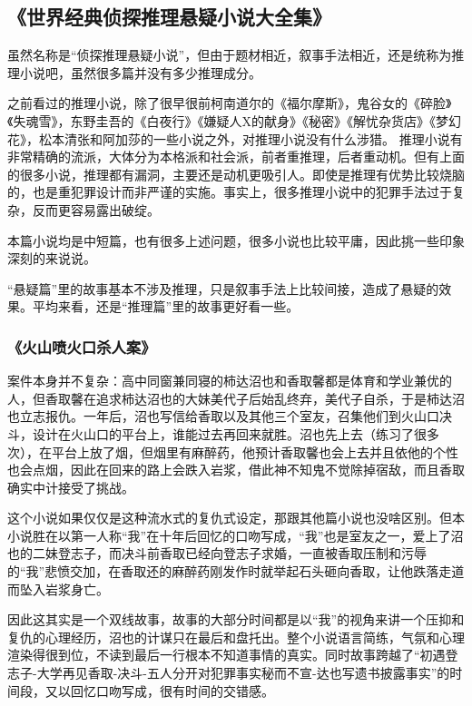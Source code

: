 \subsection{《世界经典侦探推理悬疑小说大全集》}

虽然名称是“侦探推理悬疑小说”，但由于题材相近，叙事手法相近，还是统称为推理小说吧，虽然很多篇并没有多少推理成分。

之前看过的推理小说，除了很早很前柯南道尔的《福尔摩斯》，鬼谷女的《碎脸》《失魂雪》，东野圭吾的《白夜行》《嫌疑人X的献身》《秘密》《解忧杂货店》《梦幻花》，松本清张和阿加莎的一些小说之外，对推理小说没有什么涉猎。
推理小说有非常精确的流派，大体分为本格派和社会派，前者重推理，后者重动机。但有上面的很多小说，推理都有漏洞，主要还是动机更吸引人。即使是推理有优势比较烧脑的，也是重犯罪设计而非严谨的实施。事实上，很多推理小说中的犯罪手法过于复杂，反而更容易露出破绽。

本篇小说均是中短篇，也有很多上述问题，很多小说也比较平庸，因此挑一些印象深刻的来说说。

“悬疑篇”里的故事基本不涉及推理，只是叙事手法上比较间接，造成了悬疑的效果。平均来看，还是“推理篇”里的故事更好看一些。

\subsubsection{《火山喷火口杀人案》}

案件本身并不复杂：高中同窗兼同寝的柿达沼也和香取馨都是体育和学业兼优的人，但香取馨在追求柿达沼也的大妹美代子后始乱终弃，美代子自杀，于是柿达沼也立志报仇。一年后，沼也写信给香取以及其他三个室友，召集他们到火山口决斗，设计在火山口的平台上，谁能过去再回来就胜。沼也先上去（练习了很多次），在平台上放了烟，但烟里有麻醉药，他预计香取馨也会上去并且依他的个性也会点烟，因此在回来的路上会跌入岩浆，借此神不知鬼不觉除掉宿敌，而且香取确实中计接受了挑战。

这个小说如果仅仅是这种流水式的复仇式设定，那跟其他篇小说也没啥区别。但本小说胜在以第一人称“我”在十年后回忆的口吻写成，“我”也是室友之一，爱上了沼也的二妹登志子，而决斗前香取已经向登志子求婚，一直被香取压制和污辱的“我”悲愤交加，在香取还的麻醉药刚发作时就举起石头砸向香取，让他跌落走道而坠入岩浆身亡。

因此这其实是一个双线故事，故事的大部分时间都是以“我”的视角来讲一个压抑和复仇的心理经历，沼也的计谋只在最后和盘托出。整个小说语言简练，气氛和心理渲染得很到位，不读到最后一行根本不知道事情的真实。同时故事跨越了“初遇登志子-大学再见香取-决斗-五人分开对犯罪事实秘而不宣-达也写遗书披露事实”的时间段，又以回忆口吻写成，很有时间的交错感。

